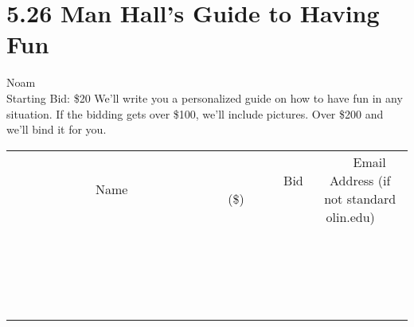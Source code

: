 \documentclass[11pt]{article}
\begin{document}
\section*{5.26 Man Hall's Guide to Having Fun}
Noam
\\
Starting Bid: \$20
\newline
We'll write you a personalized guide on how to have fun in any situation. If the bidding gets over \$100, we'll include pictures. Over \$200 and we'll bind it for you.
\\[3ex]
\begin{tabular}{c c c}
~~~~~~~~~~~~~Name~~~~~~~~~~~~~ & ~~~~~~~~~Bid (\$)~~~~~~~~~  & ~~~Email Address (if not standard olin.edu)~~~\\
 & & \\
\hline
 & & \\
\hline
 & & \\
\hline
 & & \\
\hline
 & & \\
\hline
 & & \\
\hline
 & & \\
\hline
 & & \\
\hline
 & & \\
\hline
 & & \\
\hline
 & & \\
\hline
 & & \\
\hline
 & & \\
\hline
 & & \\
\hline
 & & \\
\hline
 & & \\
\hline
 & & \\
\hline
 & & \\
\hline
 & & \\
\hline
\end{tabular}
\newpage
\end{document}
